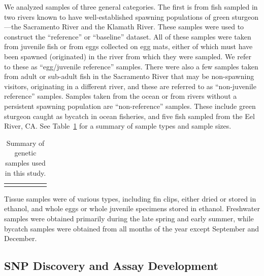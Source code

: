 \documentclass[twocolumn,natbib]{svjour3}       %
\begin{document}
We analyzed samples of three general categories. The first is from fish sampled in
two rivers known to have well-established spawning populations of green
sturgeon---the Sacramento River and the Klamath River. These samples were used to
construct the ``reference'' or ``baseline'' dataset. All of these samples were taken
from juvenile fish or from eggs collected on egg mats, either of which must have
been spawned (originated) in the river from which they were sampled. We refer to
these as ``egg/juvenile reference'' samples. There were also a few samples taken
from adult or sub-adult fish in the Sacramento River that may be non-spawning
visitors, originating in a different river, and these are referred to as
``non-juvenile reference'' samples. Samples taken from the ocean or from rivers
without a persistent spawning population are ``non-reference''
samples. These include green sturgeon caught as bycatch in ocean fisheries, and
five fish sampled from the Eel River, CA. See Table~\ref{tab:samps} for a summary of sample
types and sample sizes. 
\begin{table}
\caption{Summary of genetic samples used in this study.}
\begin{center}
\begin{tabular}{llllrr}
\hline \hline \\ 

\hline \hline \\ 
\end{tabular}
\end{center}
\label{tab:samps}
\end{table}
Tissue samples were of various types, including fin clips, either dried or 
stored in ethanol, and whole eggs or whole
juvenile specimens stored in ethanol. Freshwater samples were  
obtained primarily during the late spring and early summer, 
while bycatch samples were obtained from
all months of the year except September and December.


\subsection{SNP Discovery and Assay Development}
\end{document}
